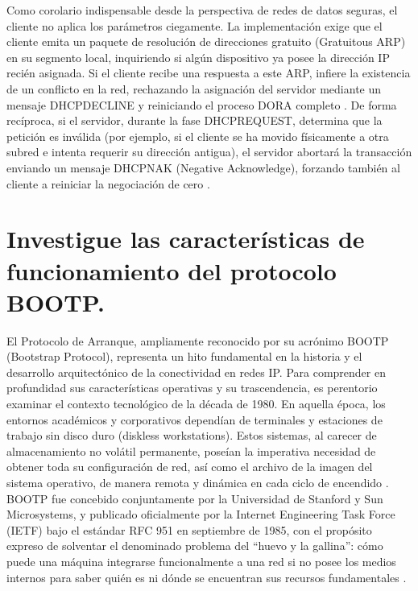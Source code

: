 \documentclass[a4paper,12pt]{article}
\begin{document}
Como corolario indispensable desde la perspectiva de redes de datos seguras, el cliente no aplica los parámetros ciegamente. La implementación exige que el cliente emita un paquete de resolución de direcciones gratuito (Gratuitous ARP) en su segmento local, inquiriendo si algún dispositivo ya posee la dirección IP recién asignada. Si el cliente recibe una respuesta a este ARP, infiere la existencia de un conflicto en la red, rechazando la asignación del servidor mediante un mensaje DHCPDECLINE y reiniciando el proceso DORA completo \cite{rfc2131}. De forma recíproca, si el servidor, durante la fase DHCPREQUEST, determina que la petición es inválida (por ejemplo, si el cliente se ha movido físicamente a otra subred e intenta requerir su dirección antigua), el servidor abortará la transacción enviando un mensaje DHCPNAK (Negative Acknowledge), forzando también al cliente a reiniciar la negociación de cero \cite{rfc2131, microsoft_dhcp}.

\newpage

\section{Investigue las características de funcionamiento del protocolo BOOTP.}

El Protocolo de Arranque, ampliamente reconocido por su acrónimo BOOTP (Bootstrap Protocol), representa un hito fundamental en la historia y el desarrollo arquitectónico de la conectividad en redes IP. Para comprender en profundidad sus características operativas y su trascendencia, es perentorio examinar el contexto tecnológico de la década de 1980. En aquella época, los entornos académicos y corporativos dependían de terminales y estaciones de trabajo sin disco duro (diskless workstations). Estos sistemas, al carecer de almacenamiento no volátil permanente, poseían la imperativa necesidad de obtener toda su configuración de red, así como el archivo de la imagen del sistema operativo, de manera remota y dinámica en cada ciclo de encendido \cite{ionos_bootp}. BOOTP fue concebido conjuntamente por la Universidad de Stanford y Sun Microsystems, y publicado oficialmente por la Internet Engineering Task Force (IETF) bajo el estándar RFC 951 en septiembre de 1985, con el propósito expreso de solventar el denominado problema del ``huevo y la gallina'': cómo puede una máquina integrarse funcionalmente a una red si no posee los medios internos para saber quién es ni dónde se encuentran sus recursos fundamentales \cite{rfc951, ionos_bootp}.
\end{document}
